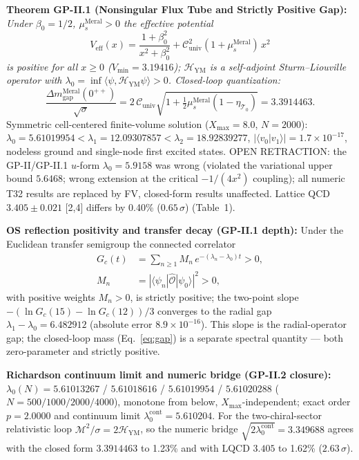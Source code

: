\documentclass[12pt,a4paper]{article}
\begin{document}
\textbf{Theorem GP-II.1 (Nonsingular Flux Tube and Strictly Positive Gap):}
\textit{Under $\beta_0=1/2$, $\mu_s^{\mathrm{Meral}}>0$ the effective potential}
\begin{equation}
\label{eq:veff}
\boxed{V_{\mathrm{eff}}(x)=\frac{1+\beta_0^2}{x^2+\beta_0^2}
+\mathcal{C}_{\mathrm{univ}}^2(1+\mu_s^{\mathrm{Meral}})\,x^2}
\end{equation}
\textit{is positive for all $x\ge 0$ ($V_{\min}=3.19416$); $\mathcal{H}_{\mathrm{YM}}$
is a self-adjoint Sturm--Liouville operator with
$\lambda_0=\inf\langle\psi,\mathcal{H}_{\mathrm{YM}}\psi\rangle>0$.
Closed-loop quantization:}
\begin{equation}
\label{eq:gap}
\boxed{\frac{\Delta m_{\mathrm{gap}}^{\mathrm{Meral}}(0^{++})}{\sqrt{\sigma}}
=2\,\mathcal{C}_{\mathrm{univ}}\sqrt{1+\tfrac{1}{2}\mu_s^{\mathrm{Meral}}
(1-\eta_{\mathcal{T}_0})}=3.3914463.}
\end{equation}
Symmetric cell-centered finite-volume solution ($X_{\max}=8.0$, $N=2000$):
$\lambda_0=5.61019954<\lambda_1=12.09307857<\lambda_2=18.92839277$,
$|\langle v_0|v_1\rangle|=1.7\times 10^{-17}$, nodeless ground and
single-node first excited states. OPEN RETRACTION: the GP-II/GP-II.1
$u$-form $\lambda_0=5.9158$ was wrong (violated the variational upper bound
$5.6468$; wrong extension at the critical $-1/(4x^2)$ coupling); all numeric
T32 results are replaced by FV, closed-form results unaffected.
Lattice QCD $3.405\pm 0.021$ [2,4] differs by 0.40\% ($0.65\,\sigma$) (Table~1).

\textbf{OS reflection positivity and transfer decay (GP-II.1 depth):}
Under the Euclidean transfer semigroup the connected correlator
\begin{equation*}
\begin{split}
G_c(t) &=\sum_{n\ge 1} M_n\,e^{-(\lambda_n-\lambda_0)t}>0,\\
M_n &=|\langle\psi_n|\hat{\mathcal{O}}|\psi_0\rangle|^2>0,
\end{split}
\end{equation*}
with positive weights $M_n>0$,
is strictly positive; the two-point slope
$-(\ln G_c(15)-\ln G_c(12))/3$ converges to the radial gap
$\lambda_1-\lambda_0=6.482912$ (absolute error $8.9\times 10^{-16}$).
This slope is the radial-operator gap; the closed-loop mass (Eq.~\ref{eq:gap})
is a separate spectral quantity --- both zero-parameter and strictly positive.

\textbf{Richardson continuum limit and numeric bridge (GP-II.2 closure):}
$\lambda_0(N)=5.61013267$ / $5.61018616$ / $5.61019954$ / $5.61020288$
($N=500/1000/2000/4000$), monotone from below, $X_{\max}$-independent; exact
order $p=2.0000$ and continuum limit $\lambda_0^{\mathrm{cont}}=5.610204$.
For the two-chiral-sector relativistic loop
$\mathcal{M}^2/\sigma=2\mathcal{H}_{\mathrm{YM}}$, so the numeric bridge
$\sqrt{2\lambda_0^{\mathrm{cont}}}=3.349688$ agrees with the closed form
$3.3914463$ to 1.23\% and with LQCD $3.405$ to 1.62\% ($2.63\,\sigma$).
\end{document}
